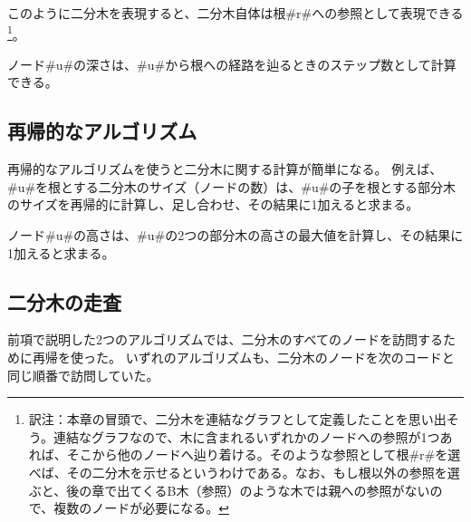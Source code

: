 このように二分木を表現すると、二分木自体は根#r#への参照として表現できる
\footnote{訳注：本章の冒頭で、二分木を連結なグラフとして定義したことを思い出そう。連結なグラフなので、木に含まれるいずれかのノードへの参照が1つあれば、そこから他のノードへ辿り着ける。そのような参照として根#r#を選べば、その二分木を示せるというわけである。なお、もし根以外の参照を選ぶと、後の章で出てくるB木（参照）のような木では親への参照がないので、複数のノードが必要になる。}。

ノード#u#の深さは、#u#から根への経路を辿るときのステップ数として計算できる。


\subsection{再帰的なアルゴリズム}

%
再帰的なアルゴリズムを使うと二分木に関する計算が簡単になる。
例えば、#u#を根とする二分木のサイズ（ノードの数）は、#u#の子を根とする部分木のサイズを再帰的に計算し、足し合わせ、その結果に1加えると求まる。


ノード#u#の高さは、#u#の2つの部分木の高さの最大値を計算し、その結果に1加えると求まる。


\subsection{二分木の走査}

%
%
%
前項で説明した2つのアルゴリズムでは、二分木のすべてのノードを訪問するために再帰を使った。
いずれのアルゴリズムも、二分木のノードを次のコードと同じ順番で訪問していた。

